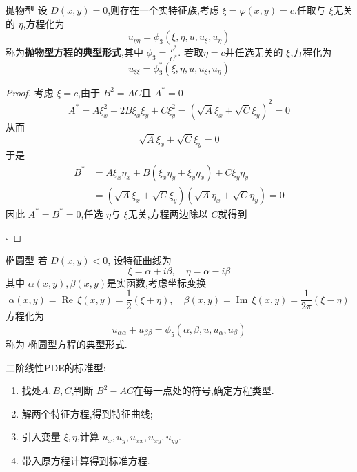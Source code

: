\documentclass[../../PDE.tex]{subfiles}
\begin{document}
\begin{proposition}{抛物型}
    设 \(  D\left( x,y \right)= 0   \),则存在一个实特征族,考虑 \(   \xi =  \varphi \left( x,y \right)= c   \).任取与 \(   \xi   \)无关的 \(  \eta   \),方程化为 \[
    u_{\eta \eta }= \phi _3 \left(  \xi ,\eta ,u,u_{ \xi },u_{\eta } \right) 
    \] 称为\textbf{抛物型方程的典型形式},其中 \(  \phi _3 = \frac{F^{*} }{ C^{*}}   \).
    若取\(  \eta = c  \)并任选无关的 \(   \xi   \),方程化为 \[
    u_{ \xi  \xi }= \phi _3 ^{*}\left(  \xi ,\eta ,u,u_{ \xi },u_{\eta } \right) 
    \]      
\end{proposition}
\begin{proof}
考虑 \(   \xi = c  \),由于 \(  B^{2} =  AC  \)且 \(  A^{*}= 0  \) \[
A^{*}= A \xi _{x}^{2}+ 2B \xi _{x} \xi _{y}+ C \xi _{y}^{2}= \left( \sqrt{A} \xi _{x}+ \sqrt{C} \xi _{y} \right)^{2}= 0 
\]   从而 \[
\sqrt{A} \xi _{x}+ \sqrt{C} \xi _{y}= 0
\]于是 \[
\begin{aligned}
    B ^{*}&= A \xi _{x}\eta _{x}+ B\left(  \xi _{x}\eta _{y}+  \xi _{y}\eta _{x} \right)+ C \xi _{y}\eta _{y} \\ 
     & = \left( \sqrt{A} \xi _{x}+ \sqrt{C} \xi _{y} \right)\left( \sqrt{A}\eta _{x}+ \sqrt{C}\eta _{y} \right)= 0  
\end{aligned} 
\]因此 \(  A^{*}= B^{*}= 0  \),任选 \(  \eta   \)与 \(   \xi   \)无关,方程两边除以 \(  C  \)就得到    

    \hfill $\square$
\end{proof}

\begin{proposition}{椭圆型}
    若 \(  D\left( x,y \right)<0   \), 
    设特征曲线为 \[
     \xi  = \alpha + i\beta ,\quad \eta = \alpha -i\beta 
    \]其中 \(  \alpha \left( x,y \right), \beta \left( x,y \right)    \)是实函数,考虑坐标变换 \[
    \alpha \left( x,y \right)= \operatorname{Re}\, \xi \left( x,y \right)=  \frac{1}{2}\left(  \xi + \eta  \right),\quad \beta \left( x,y \right)= \operatorname{Im}\, \xi \left( x,y \right)= \frac{1 }{2\pi  }\left(  \xi -\eta  \right)        
    \] 
    方程化为 \[
    u_{\alpha \alpha }+ u_{\beta \beta }= \phi _5 \left( \alpha ,\beta ,u,u_{\alpha },u_{\beta } \right) 
    \]称为 椭圆型方程的典型形式.
\end{proposition}


\begin{remark}
    二阶线性PDE的标准型:

    \begin{enumerate}
        \item 找处\(  A,B,C  \),判断 \(  B^{2}-AC  \)在每一点处的符号,确定方程类型.
        \item 解两个特征方程,得到特征曲线;
        \item 引入变量 \(   \xi ,\eta   \),计算 \(  u_{x},u_{y},u_{xx},u_{xy},u_{yy}  \).
        \item 带入原方程计算得到标准方程.    
    \end{enumerate}
    
\end{remark}
\end{document}

